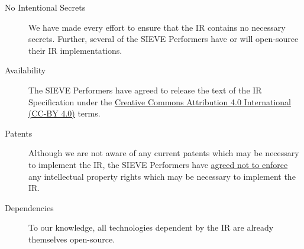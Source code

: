 \begin{description}
  \item[No Intentional Secrets] We have made every effort to ensure that the IR contains no necessary secrets. Further, several of the SIEVE Performers have or will open-source their IR implementations.
  \item[Availability] The SIEVE Performers have agreed to release the text of the IR Specification under the \href{https://creativecommons.org/licenses/by/4.0/}{Creative Commons Attribution 4.0 International (CC-BY 4.0)} terms.
  \item[Patents] Although we are not aware of any current patents which may be necessary to implement the IR, the SIEVE Performers have \href{https://github.com/sieve-zk/ir/raw/main/v1.0.1/release_acknowledgments.pdf}{agreed not to enforce} any intellectual property rights which may be necessary to implement the IR.
  \item[Dependencies] To our knowledge, all technologies dependent by the IR are already themselves open-source.
\end{description}
